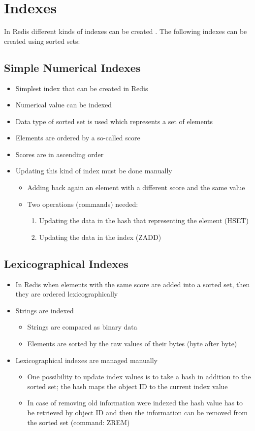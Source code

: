 \chapter{Indexes}

In Redis different kinds of indexes can be created \cite{redis_indexes}. The following indexes can be created using sorted sets:

\section{Simple Numerical Indexes}
\begin{itemize}
\item Simplest index that can be created in Redis
\item Numerical value can be indexed
\item Data type of sorted set is used which represents a set of elements
\item Elements are ordered by a so-called score
\item Scores are in ascending order
\item Updating this kind of index must be done manually
\begin{itemize}
\item Adding back again an element with a different score and the same value
\item Two operations (commands) needed:
\begin{enumerate}
\item Updating the data in the hash that representing the element    (HSET)
\item Updating the data in the index (ZADD)
\end{enumerate}
\end{itemize}
\end{itemize}

\section{Lexicographical Indexes}
\begin{itemize}
\item In Redis when elements with the same score are added into a sorted set, then they are ordered lexicographically
\item Strings are indexed
\begin{itemize}
\item Strings are compared as binary data
\item Elements are sorted by the raw values of their bytes (byte after byte)
\end{itemize}
\item Lexicographical indexes are managed manually
\begin{itemize}
\item One possibility to update index values is to take a hash in addition to    the sorted set; the hash maps the object ID to the current index value
\item In case of removing old information were indexed the hash value   has to be retrieved by object ID and then the information can be removed from the sorted set (command: ZREM)
\end{itemize}
\end{itemize}

